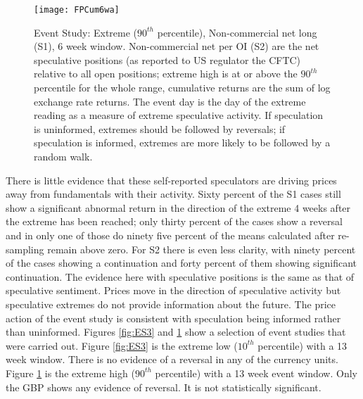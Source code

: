 \documentclass[ijfs,article,submit,oneauthor,pdftex,10pt,a4paper]{mdpi}
\begin{document}
\begin{figure}
\graphicspath{{../Figures/}}
\centering
\texttt{[image: FPCum6wa]}
\caption{Event Study:  Extreme ($90^{th}$ percentile), Non-commercial net long (S1), 6 week window. Non-commercial net per OI (S2) are the net speculative positions (as reported to US regulator the CFTC) relative to all open positions; extreme high is at or above the $90^{th}$ percentile for the whole range, cumulative returns are the sum of log exchange rate returns. The event day is the day of the extreme reading as a measure of extreme speculative activity.  If speculation is uninformed, extremes should be followed by reversals; if speculation is informed, extremes are more likely to be followed by a random walk.}
\label{fig:ES4}
\end{figure}

There is little evidence that these self-reported speculators are driving prices away from fundamentals with their activity. Sixty percent of the S1 cases still show a significant abnormal return in the direction of the extreme 4 weeks after the extreme has been reached; only thirty percent of the cases show a reversal and in only one of those do ninety five percent of the means calculated after re-sampling remain above zero.  For S2 there is even less clarity, with ninety percent of the cases showing a continuation and forty percent of them showing significant continuation.  The evidence here with speculative positions is the same as that of speculative sentiment.  Prices move in the direction of speculative activity but speculative extremes do not provide information about the future. The price action of the event study is consistent with speculation being informed rather than uninformed.  Figures \ref{fig:ES3} and \ref{fig:ES4} show a selection of event studies that were carried out.  Figure \ref{fig:ES3} is the extreme low ($10^{th}$ percentile) with a 13 week window. There is no evidence of a reversal in any of the currency units.   Figure \ref{fig:ES4} is the extreme high ($90^{th}$ percentile) with a 13 week event window.  Only the GBP shows any evidence of reversal. It is not statistically significant. 
\end{document}
